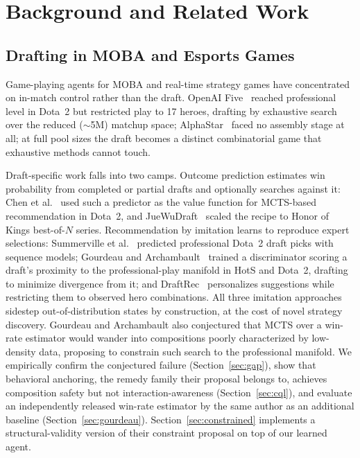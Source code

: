 \documentclass[journal]{IEEEtran}
\begin{document}
\section{Background and Related Work}

\subsection{Drafting in MOBA and Esports Games}

Game-playing agents for MOBA and real-time strategy games have concentrated on in-match control rather than the draft. OpenAI Five~\cite{berner2019dota} reached professional level in Dota~2 but restricted play to 17 heroes, drafting by exhaustive search over the reduced ($\sim$5M) matchup space; AlphaStar~\cite{vinyals2019grandmaster} faced no assembly stage at all; at full pool sizes the draft becomes a distinct combinatorial game that exhaustive methods cannot touch.

Draft-specific work falls into two camps. Outcome prediction estimates win probability from completed or partial drafts and optionally searches against it: Chen et al.~\cite{chen2018drafting} used such a predictor as the value function for MCTS-based recommendation in Dota~2, and JueWuDraft~\cite{chen2021juewudraft} scaled the recipe to Honor of Kings best-of-$N$ series. Recommendation by imitation learns to reproduce expert selections: Summerville et al.~\cite{summerville2016draft} predicted professional Dota~2 draft picks with sequence models; Gourdeau and Archambault~\cite{gourdeau2021discriminative} trained a discriminator scoring a draft's proximity to the professional-play manifold in HotS and Dota~2, drafting to minimize divergence from it; and DraftRec~\cite{lee2022draftrec} personalizes suggestions while restricting them to observed hero combinations. All three imitation approaches sidestep out-of-distribution states by construction, at the cost of novel strategy discovery. Gourdeau and Archambault also conjectured that MCTS over a win-rate estimator would wander into compositions poorly characterized by low-density data, proposing to constrain such search to the professional manifold. We empirically confirm the conjectured failure (Section~\ref{sec:gap}), show that behavioral anchoring, the remedy family their proposal belongs to, achieves composition safety but not interaction-awareness (Section~\ref{sec:cql}), and evaluate an independently released win-rate estimator by the same author as an additional baseline (Section~\ref{sec:gourdeau}). Section~\ref{sec:constrained} implements a structural-validity version of their constraint proposal on top of our learned agent.
\end{document}
